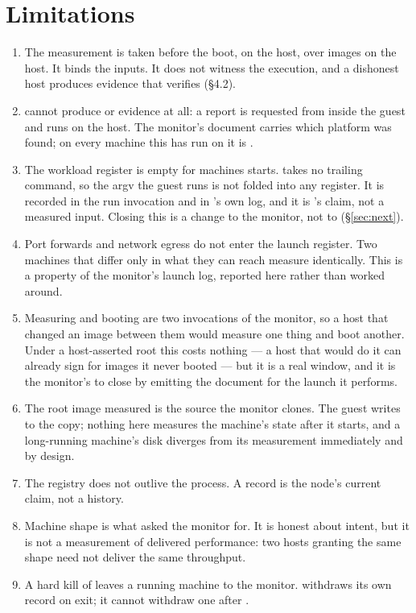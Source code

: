 \documentclass[11pt]{article}
\theoremstyle{definition}
\begin{document}
\section{Limitations}
\label{sec:limits}

\begin{enumerate}[leftmargin=1.6em]
  \item The measurement is taken before the boot, on the host, over images on the
    host. It binds the inputs. It does not witness the execution, and a
    dishonest host produces evidence that verifies (§4.2).
  \item {} cannot produce  or  evidence at all: a
    report is requested from inside the guest and  runs on the host.
    The monitor's document carries which platform was found; on every machine
    this has run on it is .
  \item The workload register is empty for machines  starts.
     takes no trailing command, so the argv the guest runs
    is not folded into any register. It is recorded in the run invocation and in
    's own log, and it is 's claim, not a measured
    input. Closing this is a change to the monitor, not to 
    (§\ref{sec:next}).
  \item Port forwards and network egress do not enter the launch register. Two
    machines that differ only in what they can reach measure identically. This is
    a property of the monitor's launch log, reported here rather than worked
    around.
  \item Measuring and booting are two invocations of the monitor, so a host that
    changed an image between them would measure one thing and boot another. Under
    a host-asserted root this costs nothing --- a host that would do it can
    already sign for images it never booted --- but it is a real window, and it
    is the monitor's to close by emitting the document for the launch it performs.
  \item The root image measured is the source the monitor clones. The guest
    writes to the copy; nothing here measures the machine's state after it starts,
    and a long-running machine's disk diverges from its measurement immediately
    and by design.
  \item The registry does not outlive the process. A record is the node's current
    claim, not a history.
  \item Machine shape is what  asked the monitor for. It is honest
    about intent, but it is not a measurement of delivered performance: two hosts
    granting the same shape need not deliver the same throughput.
  \item A hard kill of  leaves a running machine to the monitor.
     withdraws its own record on exit; it cannot withdraw one
    after .
\end{enumerate}
\end{document}
